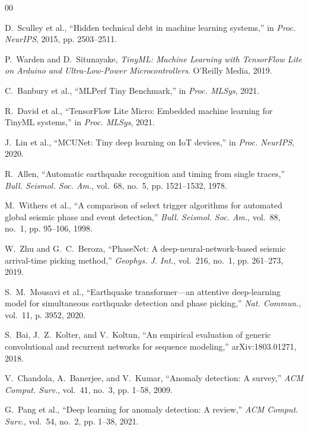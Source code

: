 \documentclass[conference]{IEEEtran}
\begin{document}
\begin{thebibliography}{00}

D.~Sculley et al.,
``Hidden technical debt in machine learning systems,''
in \textit{Proc. NeurIPS}, 2015, pp. 2503--2511.

P.~Warden and D.~Situnayake,
\textit{TinyML: Machine Learning with TensorFlow Lite on Arduino and
Ultra-Low-Power Microcontrollers}.
O'Reilly Media, 2019.

C.~Banbury et al.,
``MLPerf Tiny Benchmark,''
in \textit{Proc. MLSys}, 2021.

R.~David et al.,
``TensorFlow Lite Micro: Embedded machine learning for TinyML systems,''
in \textit{Proc. MLSys}, 2021.

J.~Lin et al.,
``MCUNet: Tiny deep learning on IoT devices,''
in \textit{Proc. NeurIPS}, 2020.

R.~Allen,
``Automatic earthquake recognition and timing from single traces,''
\textit{Bull. Seismol. Soc. Am.}, vol.~68, no.~5, pp. 1521--1532, 1978.

M.~Withers et al.,
``A comparison of select trigger algorithms for automated global seismic
phase and event detection,''
\textit{Bull. Seismol. Soc. Am.}, vol.~88, no.~1, pp. 95--106, 1998.

W.~Zhu and G.~C.~Beroza,
``PhaseNet: A deep-neural-network-based seismic arrival-time picking method,''
\textit{Geophys. J. Int.}, vol.~216, no.~1, pp. 261--273, 2019.

S.~M.~Mousavi et al.,
``Earthquake transformer---an attentive deep-learning model for simultaneous
earthquake detection and phase picking,''
\textit{Nat. Commun.}, vol.~11, p. 3952, 2020.

S.~Bai, J.~Z.~Kolter, and V.~Koltun,
``An empirical evaluation of generic convolutional and recurrent networks
for sequence modeling,''
arXiv:1803.01271, 2018.

V.~Chandola, A.~Banerjee, and V.~Kumar,
``Anomaly detection: A survey,''
\textit{ACM Comput. Surv.}, vol.~41, no.~3, pp. 1--58, 2009.

G.~Pang et al.,
``Deep learning for anomaly detection: A review,''
\textit{ACM Comput. Surv.}, vol.~54, no.~2, pp. 1--38, 2021.


\end{thebibliography}
\end{document}

